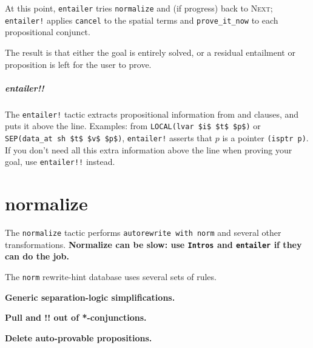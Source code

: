 \documentclass[12pt,fleqn,openany,oneside,showtrims]{memoir}
\begin{document}
At this point, \lstinline{entailer} tries \lstinline{normalize} and (if progress) back to \textsc{Next;} \lstinline{entailer!} applies \lstinline{cancel} to the spatial terms and \lstinline{prove_it_now} to each propositional conjunct.

The result is that either the goal is entirely solved, or a residual entailment or proposition is left for the user to prove.

\paragraph{entailer!!}  The \lstinline{entailer!} tactic extracts
propositional information from \LOCAL{} and \SEP{} clauses,
and puts it above the line.  Examples: from \lstinline{LOCAL(lvar $i$ $t$ $p$)}
or \lstinline{SEP(data_at sh $t$ $v$ $p$)},
\lstinline{entailer!} asserts that $p$ is a pointer \lstinline{(isptr p)}.
If you don't need all this extra information above the line when
proving your goal, use \lstinline{entailer!!} instead.

\chapter{normalize}
\label{refcard:normalize}
The \lstinline{normalize} tactic performs
\lstinline{autorewrite with norm} and several other transformations.
\textbf{Normalize can be slow:
  use \lstinline{Intros} and \lstinline{entailer}
  if they can do the job.}

The \lstinline{norm} rewrite-hint database uses several sets of rules.

\textbf{Generic separation-logic simplifications.}
\textbf{Pull \EX and !! out of *-conjunctions.}
\textbf{Delete auto-provable propositions.}
\end{document}
